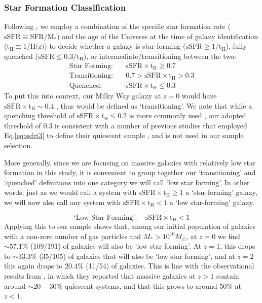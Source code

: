 \documentclass[twocolumn, linenumbers]{aastex631}
\newcommand{\sfr}{\text{SFR}}
\newcommand{\ssfr}{\text{sSFR}}
\newcommand{\tH}{\text{t}_\text{H}}
\newcommand{\eq}{Eq.\hspace{.2em}}
\newcommand{\red}[1]{{\color{red} #1}} %
\begin{document}
\subsubsection{Star Formation Classification}
\label{ssec:select}
Following \cite{mergers}, we employ a combination of the specific star formation rate ($\ssfr\equiv \sfr/\text{M}_{*}$) and the age of the Universe at the time of galaxy identification ($\tH\equiv 1/\text{H(z)}$) to decide whether a galaxy is star-forming ($\ssfr\geq 1/\tH$), fully quenched ($\ssfr\leq 0.3/\tH$), or intermediate/transitioning between the two:
\begin{align}
    \textrm{Star Forming}:\quad &\ssfr\times \tH \geq 0.7\label{eq:ssfrt1}\\
    \textrm{Transitioning}:\quad &0.7>\ssfr\times \tH>0.3\label{eq:ssfrt2}\\
    \textrm{Quenched}:\quad &\ssfr \times \tH \leq 0.3\label{eq:ssfrt3}
\end{align}
To put this into context, our Milky Way galaxy at $z=0$ would have $\ssfr\times\tH\sim0.4$ \citep{Licquia15}, thus would be defined as `transitioning'.  We note that while a quenching threshold of $\ssfr\times \tH\leq 0.2$ is more commonly used \citep{Tacchella15, Pacifici16, whitakerReview}, our adopted threshold of 0.3 is consistent with a number of previous studies that employed \eq \ref{eq:ssfrt3} to define their quiescent sample \citep[e.g.][]{Franx08,Williams10, Szomoru13, Lotz19}, and is not used in our sample selection.


More generally, since we are focusing on massive galaxies with relatively low star formation in this study, it is convenient to group together our `transitioning' and `quenched' definitions into one category we will call `low star forming'.  In other words, just as we would call a system with $\ssfr\times \tH\geq 1$ a `star-forming' galaxy, we will now also call any system with $\ssfr\times \tH<1$ a `low star-forming' galaxy.

\begin{equation}
     \textrm{`Low Star Forming'}:\quad \ssfr\times \tH < 1
     \label{eq:ssfrt4}
\end{equation}
\red{Applying this to our sample shows that, among our initial population of galaxies with a non-zero number of gas particles and $M_*>10^{10}M_\odot$, at $z=0$ we find$\sim 57.1\%$ (109/191) of galaxies will also be `low star forming'.  At $z=1$, this drops to $\sim 33.3\%$ (35/105) of galaxies that will also be `low star forming', and at $z=2$ this again drops to $20.4\%$ (11/54) of galaxies.  This is line with the observational results from \cite{Weaver23}, in which they reported that massive galaxies at $z>1$ contain around $\sim20-30\%$ quiescent systems, and that this grows to around $50\%$ at $z<1$.}
\end{document}
